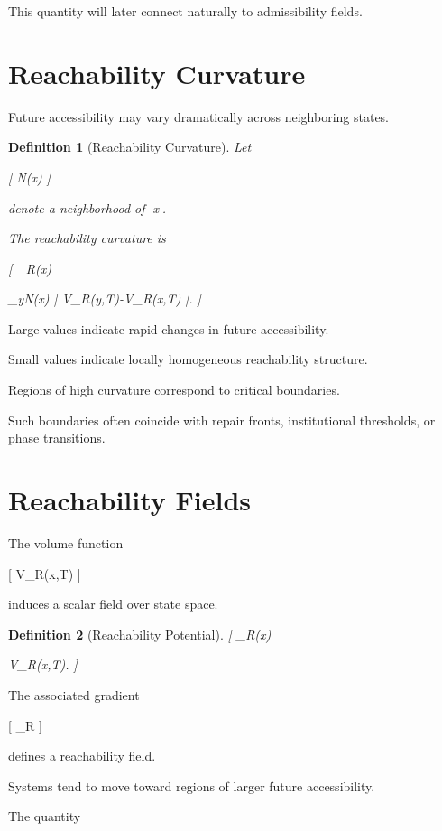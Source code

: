 \documentclass[11pt,oneside,openany]{book}
\newtheorem{definition}{Definition}[chapter] \newtheorem{theorem}{Theorem}[chapter] \newtheorem{proposition}{Proposition}[chapter] \newtheorem{lemma}{Lemma}[chapter] \newtheorem{corollary}{Corollary}[chapter] \newtheorem{remark}{Remark}[chapter]
\begin{document}
This quantity will later connect naturally to admissibility fields.

\section{Reachability Curvature}

Future accessibility may vary dramatically across neighboring states.

\begin{definition}[Reachability Curvature]

Let

[
N(x)
]

denote a neighborhood of x.

The reachability curvature is

[
\kappa_R(x)

\sum_{y\in N(x)}
\left|
V_R(y,T)-V_R(x,T)
\right|.
]

\end{definition}

Large values indicate rapid changes in future accessibility.

Small values indicate locally homogeneous reachability structure.

Regions of high curvature correspond to critical boundaries.

Such boundaries often coincide with repair fronts, institutional thresholds, or phase transitions.

\section{Reachability Fields}

The volume function

[
V_R(x,T)
]

induces a scalar field over state space.

\begin{definition}[Reachability Potential]

[
\Phi_R(x)

\log V_R(x,T).
]

\end{definition}

The associated gradient

[
\nabla\Phi_R
]

defines a reachability field.

Systems tend to move toward regions of larger future accessibility.

The quantity
\end{document}
